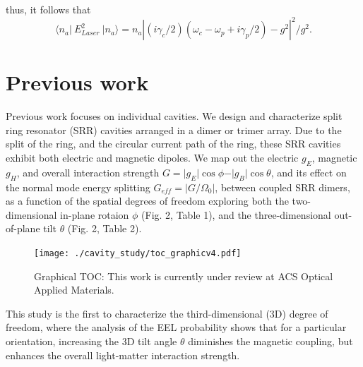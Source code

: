 \documentclass[12pt]{article}
\begin{document}
thus, it follows that
\begin{equation}
\langle n_a \vert \: E_{Laser}^2 \: \vert n_a \rangle = n_a
    \left\vert 
    ( i\gamma_c/2 )( \omega_c - \omega_p + i\gamma_p/2 ) -g^2 
    \right\vert^2
    / g^2.
\end{equation}


\section{Previous work}
Previous work focuses on individual cavities. \cite{pakeltis2019focused}
We design and characterize split ring resonator (SRR) cavities arranged 
in a dimer or trimer array. Due to the split of the ring, and the 
circular current path of the ring, these SRR cavities exhibit both 
electric and magnetic dipoles. We map out the electric $g_E$, magnetic 
$g_H$, and overall interaction strength 
$G = \vert g_E \vert \cos\phi - \vert g_B \vert \cos\theta$, 
and its effect on the normal mode energy splitting 
$G_{eff} = \left\vert G/\Omega_0 \right\vert$, between coupled 
SRR dimers, as a function of the spatial degrees of freedom\textemdash
exploring both the two-dimensional in-plane rotaion $\phi$ 
(Fig. 2, Table 1), and the three-dimensional out-of-plane tilt $\theta$ 
(Fig. 2, Table 2).
\begin{figure}[H]
  \begin{center}
    \texttt{[image: ./cavity\_study/toc\_graphicv4.pdf]}
  \end{center}
  \caption{Graphical TOC: This work is currently under review at 
  ACS Optical Applied Materials.}
\end{figure}
This study is the first to characterize the third-dimensional (3D) degree of 
freedom, where the analysis of the EEL probability shows that for a particular
orientation, increasing the 3D tilt angle $\theta$ diminishes the magnetic 
coupling, but enhances the overall light-matter interaction strength. 
\end{document}

